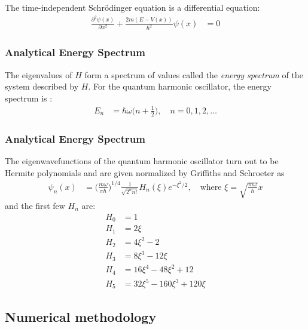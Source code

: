 The time-independent Schrödinger equation is a differential equation:
\begin{align*}
    \frac{\partial^2 \psi(x)}{\partial x^2} + \frac{2m(E-V(x))}{\hbar^2}\psi(x) &= 0
\end{align*}

\subsubsection{Analytical Energy Spectrum}

The eigenvalues of $H$ form a spectrum of values called the \textit{energy spectrum} of the system described by $H$. For the quantum harmonic oscillator, the energy spectrum is \cite[page 51]{Griffiths2018}:
\begin{align*}
    E_n &= \hbar\omega\Big(n+\frac{1}{2}\Big), \quad n=0,1,2,\dots
\end{align*}

\subsubsection{Analytical Energy Spectrum}

The eigenwavefunctions of the quantum harmonic oscillator turn out to be Hermite polynomials and are given normalized by Griffiths and Schroeter \cite[page 52]{Griffiths2018} as
\begin{align*}
    \psi_n(x) &= \Big(\frac{m\omega}{\pi\hbar}\Big)^{1/4} \frac{1}{\sqrt{2^n n!}} H_n(\xi) e^{-\xi^2/2}, \quad \text{where } \xi = \sqrt{\frac{m\omega}{\hbar}}x
\end{align*}
%
and the first few $H_n$ are:
\begin{align*}
    H_0 &= 1 \\
    H_1 &= 2\xi \\
    H_2 &= 4\xi^2 - 2 \\
    H_3 &= 8\xi^3 - 12\xi \\
    H_4 &= 16\xi^4 - 48\xi^2 + 12 \\
    H_5 &= 32\xi^5 - 160\xi^3 + 120\xi
\end{align*}
















\subsection{Numerical methodology}


